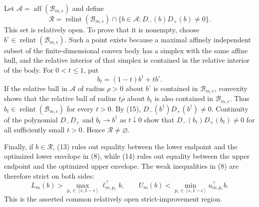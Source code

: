 Let \(\mathcal A=\operatorname{aff}(\mathcal B_{m,\epsilon})\) and define
\[
\mathcal R=
\operatorname{relint}(\mathcal B_{m,\epsilon})
\cap\{b\in\mathcal A:D_-(b)D_+(b)\neq0\}.                        \tag{16}
\]
This set is relatively open. To prove that it is nonempty, choose
\(b^\circ\in\operatorname{relint}(\mathcal B_{m,\epsilon})\). Such a point
exists because a maximal affinely independent subset of the finite-dimensional
convex body has a simplex with the same affine hull, and the relative interior
of that simplex is contained in the relative interior of the body. For
\(0<t\leq1\), put
\[
b_t=(1-t)b^\dagger+t b^\circ.
\]
If the relative ball in \(\mathcal A\) of radius \(\rho>0\) about
\(b^\circ\) is contained in \(\mathcal B_{m,\epsilon}\), convexity shows that
the relative ball of radius \(t\rho\) about \(b_t\) is also contained in
\(\mathcal B_{m,\epsilon}\). Thus
\(b_t\in\operatorname{relint}(\mathcal B_{m,\epsilon})\) for every \(t>0\).
By (15), \(D_-(b^\dagger)D_+(b^\dagger)\neq0\). Continuity of the polynomial
\(D_-D_+\) and \(b_t\to b^\dagger\) as \(t\downarrow0\) show that
\(D_-(b_t)D_+(b_t)\neq0\) for all sufficiently small \(t>0\). Hence
\(\mathcal R\neq\varnothing\).

Finally, if \(b\in\mathcal R\), (13) rules out equality between the lower
endpoint and the optimized lower envelope in (8), while (14) rules out equality
between the upper endpoint and the optimized upper envelope. The weak
inequalities in (8) are therefore strict on both sides:
\[
L_m(b)>\max_{p_*\in[\epsilon,1-\epsilon]}
\ell_{m,p_*}^{\top}b,
\qquad
U_m(b)<\min_{p_*\in[\epsilon,1-\epsilon]}
u_{m,p_*}^{\top}b.
\]
This is the asserted common relatively open strict-improvement region.
